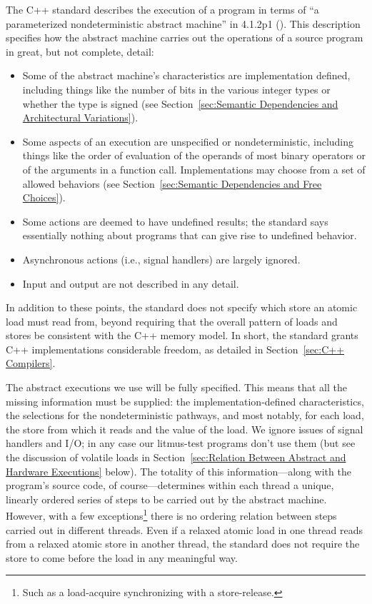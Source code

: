 The C++ standard describes the execution of a program in terms of
``a parameterized nondeterministic abstract machine'' in 4.1.2p1
().
This description specifies how the abstract machine carries out the
operations of a source program in great, but not complete, detail:
\begin{itemize}
\item	Some of the abstract machine's characteristics are
	implementation defined, including things like the number of
	bits in the various integer types
	or whether the  type is signed (see
	Section~\ref{sec:Semantic Dependencies and Architectural Variations}).
\item	Some aspects of an execution are unspecified or nondeterministic,
	including things like the order of evaluation of the operands
	of most binary operators or of the arguments in a function call.
	Implementations may choose from a set of allowed behaviors
	(see
	Section~\ref{sec:Semantic Dependencies and Free Choices}).
\item	Some actions are deemed to have undefined results; the standard
	says essentially nothing about programs that can give rise to
	undefined behavior.
\item	Asynchronous actions (i.e., signal handlers) are largely ignored.
\item	Input and output are not described in any detail.
\end{itemize}
In addition to these points, the standard does not specify which store
an atomic load must read from, beyond requiring that the overall
pattern of loads and stores be consistent with the C++ memory model.
In short, the standard grants C++ implementations considerable freedom,
as detailed in
Section~\ref{sec:C++ Compilers}.

The abstract executions we use will be fully specified.
This means that all the missing information must be supplied:
the implementation-defined characteristics, the selections for the
nondeterministic pathways, and most notably, for each load, the store
from which it reads and the value of the load.
We ignore issues of signal handlers and I/O;
in any case our litmus-test programs don't use them
(but see the discussion of volatile loads in
Section~\ref{sec:Relation Between Abstract and Hardware Executions} below).
The totality of this information---along with the program's source
code, of course---determines within each thread a unique, linearly
ordered series of steps to be carried out by the abstract machine.
However, with a few exceptions\footnote{
	Such as a load-acquire synchronizing with a store-release.}
there is no ordering relation between steps carried out
in different threads.
Even if a relaxed atomic load in one thread reads from a relaxed
atomic store in another thread, the standard does not require the
store to come before the load in any meaningful way.

